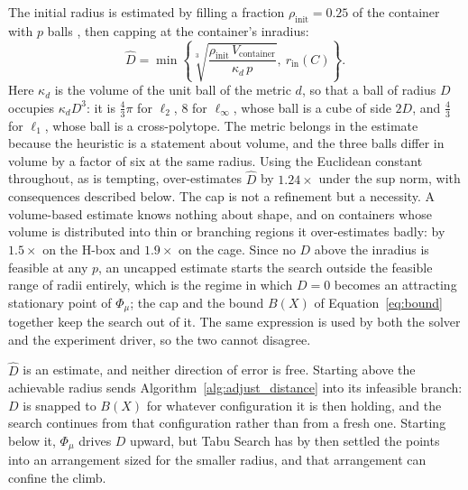 \documentclass[preprint,12pt]{elsarticle}
\theoremstyle{remark}
\newcommand{\set}[1]{\left\{ #1 \right\}}
\begin{document}
The initial radius is estimated by filling a fraction $\rho_{\text{init}} =
0.25$ of the container with $p$ balls \citep{groemer1986, lai2024}, then capping
at the container's inradius:
\begin{equation}
  \hat D = \min \set{\sqrt[3]{\frac{\rho_{\text{init}} \,
  V_{\text{container}}}{\kappa_d \, p}},\ r_{\text{in}}(C)}.
  \label{eq:dinit_of_rho}
\end{equation}
Here $\kappa_d$ is the volume of the unit ball of the metric $d$, so that a ball
of radius $D$ occupies $\kappa_d D^3$: it is $\tfrac43\pi$ for $\ell_2$, $8$ for
$\ell_\infty$, whose ball is a cube of side $2D$, and $\tfrac43$ for $\ell_1$,
whose ball is a cross-polytope. The metric belongs in the estimate because the
heuristic is a statement about volume, and the three balls differ in volume by a
factor of six at the same radius. Using the Euclidean constant throughout, as is
tempting, over-estimates $\hat D$ by $1.24\times$ under the sup norm, with
consequences described below. The cap is not a refinement but a necessity. A
volume-based estimate knows nothing about shape, and on containers whose volume
is distributed into thin or branching regions it over-estimates badly: by
$1.5\times$ on the H-box and $1.9\times$ on the cage. Since no $D$ above the
inradius is feasible at any $p$, an uncapped estimate starts the search outside
the feasible range of radii entirely, which is the regime in which $D = 0$
becomes an attracting stationary point of $\Phi_\mu$; the cap and the bound
$B(X)$ of Equation~\ref{eq:bound} together keep the search out of it. The same
expression is used by both the solver and the experiment driver, so the two
cannot disagree.

$\hat D$ is an estimate, and neither direction of error is free. Starting above
the achievable radius sends Algorithm~\ref{alg:adjust_distance} into its
infeasible branch: $D$ is snapped to $B(X)$ for whatever configuration it is
then holding, and the search continues from that configuration rather than from
a fresh one. Starting below it, $\Phi_\mu$ drives $D$ upward, but Tabu Search
has by then settled the points into an arrangement sized for the smaller radius,
and that arrangement can confine the climb.
\end{document}

